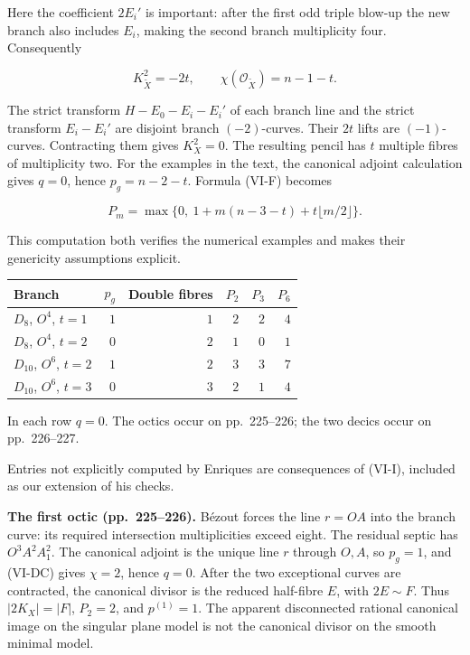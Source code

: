 Here the coefficient \(2E_i'\) is important: after the first odd triple blow-up the new branch also includes \(E_i\), making the second branch multiplicity four. Consequently

\[
K_{\widetilde X}^2=-2t,\qquad \chi(\mathcal O_{\widetilde X})=n-1-t.
\]

The strict transform \(H-E_0-E_i-E_i'\) of each branch line and the strict transform \(E_i-E_i'\) are disjoint branch \((-2)\)-curves. Their \(2t\) lifts are \((-1)\)-curves. Contracting them gives \(K_X^2=0\). The resulting pencil has \(t\) multiple fibres of multiplicity two. For the examples in the text, the canonical adjoint calculation gives \(q=0\), hence \(p_g=n-2-t\). Formula (VI-F) becomes

\[
P_m=\max\{0,\ 1+m(n-3-t)+t\lfloor m/2\rfloor\}.
\tag{VI-I}
\]

This computation both verifies the numerical examples and makes their genericity assumptions explicit.

\begin{center}
\begin{tabular}{lrrrrr}
\hline
Branch & $p_g$ & Double fibres & $P_2$ & $P_3$ & $P_6$\\
\hline
$D_8$, $O^4$, $t=1$ & $1$ & $1$ & $2$ & $2$ & $4$\\
$D_8$, $O^4$, $t=2$ & $0$ & $2$ & $1$ & $0$ & $1$\\
$D_{10}$, $O^6$, $t=2$ & $1$ & $2$ & $3$ & $3$ & $7$\\
$D_{10}$, $O^6$, $t=3$ & $0$ & $3$ & $2$ & $1$ & $4$\\
\hline
\end{tabular}
\end{center}

In each row \(q=0\). The octics occur on pp.~225--226; the two decics occur on pp.~226--227.

Entries not explicitly computed by Enriques are consequences of (VI-I), included as our extension of his checks.

\textbf{The first octic (pp.~225--226).} Bézout forces the line \(r=OA\) into the branch curve: its required intersection multiplicities exceed eight. The residual septic has \(O^3A^2A_1^2\). The canonical adjoint is the unique line \(r\) through \(O,A\), so \(p_g=1\), and (VI-DC) gives \(\chi=2\), hence \(q=0\). After the two exceptional curves are contracted, the canonical divisor is the reduced half-fibre \(E\), with \(2E\sim F\). Thus \(|2K_X|=|F|\), \(P_2=2\), and \(p^{(1)}=1\). The apparent disconnected rational canonical image on the singular plane model is not the canonical divisor on the smooth minimal model.

